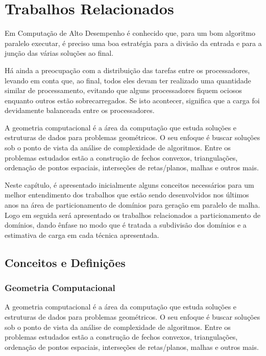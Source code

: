 \chapter{Trabalhos Relacionados}\label{cap3}


Em Computação de Alto Desempenho é conhecido que, para um bom algoritmo paralelo executar, é preciso uma boa estratégia para a divisão da entrada e para a junção das várias soluções ao final. 

Há ainda a preocupação com a distribuição das tarefas entre os processadores, levando em conta que, ao final, todos eles devam ter realizado uma quantidade similar de processamento, evitando que alguns processadores fiquem ociosos enquanto outros estão sobrecarregados. Se isto acontecer, significa que a carga foi devidamente balanceada entre os processadores.

A geometria computacional é a área da computação que estuda soluções e estruturas de dados para problemas geométricos. O seu enfoque é buscar soluções sob o ponto de vista da análise de complexidade de algoritmos. Entre os problemas estudados estão a construção de fechos convexos, triangulações, ordenação de pontos espaciais, interseções de retas/planos, malhas e outros mais.

Neste capítulo, é apresentado inicialmente alguns conceitos necessários para um melhor entendimento dos trabalhos que estão sendo desenvolvidos nos últimos anos na área de particionamento de domínios para geração em paralelo de malha. Logo em seguida será apresentado os trabalhos relacionados a particionamento de domínios, dando ênfase no modo que é tratada a subdivisão dos domínios e a estimativa de carga em cada técnica apresentada. 


\section{Conceitos e Definições}\label{Geometria computacional}

\subsection{Geometria Computacional}\label{Geometria computacional}

A geometria computacional é a área da computação que estuda soluções e estruturas de dados para problemas geométricos. O seu enfoque é buscar soluções sob o ponto de vista da análise de complexidade de algoritmos. Entre os problemas estudados estão a construção de fechos convexos, triangulações, ordenação de pontos espaciais, interseções de retas/planos, malhas e outros mais.

